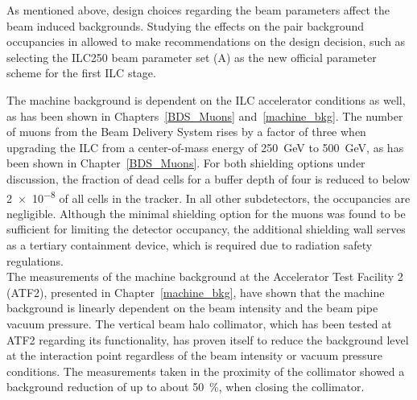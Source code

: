 As mentioned above, design choices regarding the beam parameters affect the beam induced backgrounds.
Studying the effects on the pair background occupancies in \sid allowed to make recommendations on the design decision, such as selecting the ILC250 beam parameter set (A) as the new official parameter scheme for the first ILC stage.

The machine background is dependent on the ILC accelerator conditions as well, as has been shown in Chapters~\ref{BDS_Muons} and~\ref{machine_bkg}.
The number of muons from the Beam Delivery System rises by a factor of three when upgrading the ILC from a center-of-mass energy of \SI{250}{\GeV} to \SI{500}{\GeV}, as has been shown in Chapter~\ref{BDS_Muons}.
For both shielding options under discussion, the fraction of dead cells for a buffer depth of four is reduced to below \num{2e-8} of all cells in the \sid tracker.
In all other subdetectors, the occupancies are negligible.
Although the minimal shielding option for the muons was found to be sufficient for limiting the \sid detector occupancy, the additional shielding wall serves as a tertiary containment device, which is required due to radiation safety regulations.
\\The measurements of the machine background at the Accelerator Test Facility 2 (ATF2), presented in Chapter~\ref{machine_bkg}, have shown that the machine background is linearly dependent on the beam intensity and the beam pipe vacuum pressure.
The vertical beam halo collimator, which has been tested at ATF2 regarding its functionality, has proven itself to reduce the background level at the interaction point regardless of the beam intensity or vacuum pressure conditions.
The measurements taken in the proximity of the collimator showed a background reduction of up to about \SI{50}{\percent}, when closing the collimator.


